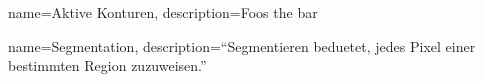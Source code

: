 {
    name=Aktive Konturen,
    description={Foos the bar}
}

{
    name=Segmentation,
    description={``Segmentieren beduetet, jedes Pixel einer bestimmten Region zuzuweisen.''~\cite[S. 133]{hudritsch:script:cp}}
}
